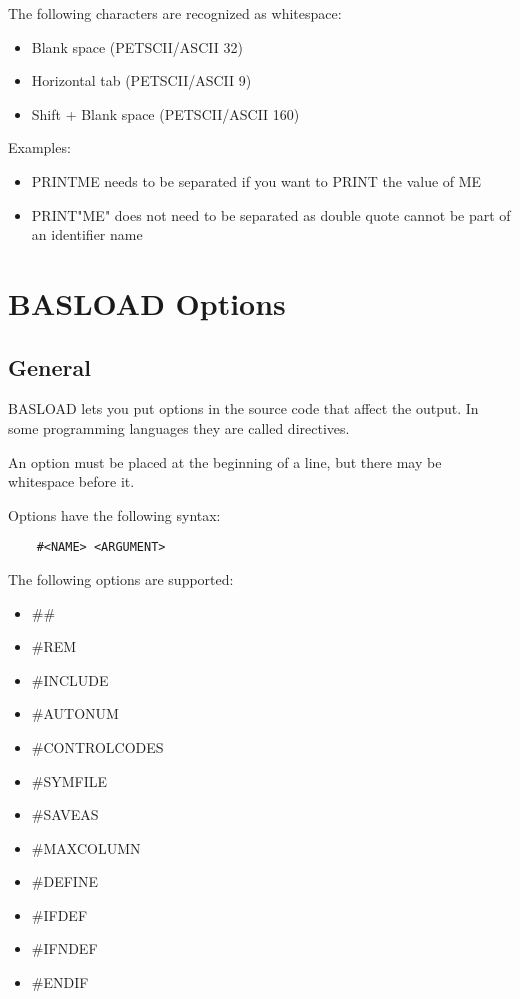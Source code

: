 \documentclass{article}
\begin{document}
        The following characters are recognized as whitespace:

        \begin{itemize}
            \item Blank space (PETSCII/ASCII 32)
            \item Horizontal tab (PETSCII/ASCII 9)
            \item Shift + Blank space (PETSCII/ASCII 160)
        \end{itemize}

        Examples:

        \begin{itemize}
            \item PRINTME needs to be separated if you want to PRINT the value of ME
            \item PRINT"ME" does not need to be separated as double quote cannot be part of an identifier name
        \end{itemize}

\section{BASLOAD Options}

    \subsection{General}

        BASLOAD lets you put options in the source code that affect the output. In some
        programming languages they are called directives.

        An option must be placed at the beginning of a line, but there may be
        whitespace before it.

        Options have the following syntax:

        \begin{verbatim}
    #<NAME> <ARGUMENT>
        \end{verbatim}

        The following options are supported:

        \begin{itemize}
            \item \#\#
            \item \#REM
            \item \#INCLUDE
            \item \#AUTONUM
            \item \#CONTROLCODES
            \item \#SYMFILE
            \item \#SAVEAS
            \item \#MAXCOLUMN
            \item \#DEFINE
            \item \#IFDEF
            \item \#IFNDEF
            \item \#ENDIF
        \end{itemize}
\end{document}
